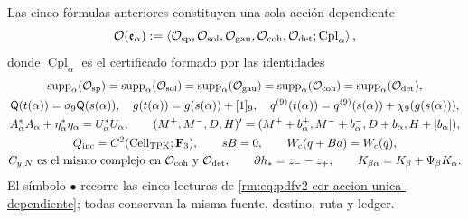 Las cinco fórmulas anteriores constituyen una sola acción dependiente
\begin{equation}
\label{rm:eq:pdfv2-cor-accion-unica-dependiente}
 \mathcal O(\mathfrak e_\alpha)
 :=\left\langle
 \mathcal O_{\rm sp},\mathcal O_{\rm sol},\mathcal O_{\rm gau},
 \mathcal O_{\rm coh},\mathcal O_{\rm det};
 \operatorname{Cpl}_\alpha
 \right\rangle,
\end{equation}
donde \(\operatorname{Cpl}_\alpha\) es el certificado formado por las
identidades
\begin{equation}
\label{rm:eq:pdfv2-cor-acoplamientos-unicos}
 \begin{gathered}
 \operatorname{supp}_\alpha(\mathcal O_{\rm sp})
 =\operatorname{supp}_\alpha(\mathcal O_{\rm sol})
 =\operatorname{supp}_\alpha(\mathcal O_{\rm gau})
 =\operatorname{supp}_\alpha(\mathcal O_{\rm coh})
 =\operatorname{supp}_\alpha(\mathcal O_{\rm det}),\\
 \mathsf Q(t(\alpha))=\sigma_9\mathsf Q(s(\alpha)),\quad
 g(t(\alpha))=g(s(\alpha))+[1]_9,\quad
 q^{(9)}(t(\alpha))=q^{(9)}(s(\alpha))+\chi_9(g(s(\alpha))),\\
 A_\alpha^*A_\alpha+\eta_\alpha^*\eta_\alpha=U_\alpha^*U_\alpha,\qquad
 (M^+,M^-,D,H)'=(M^++b_\alpha^+,M^-+b_\alpha^-,
 D+b_\alpha,H+|b_\alpha|),\\
 Q_{\rm inc}=C^2(\operatorname{Cell}_{\rm TPK};\mathbf F_3),\qquad
 sB=0,\qquad W_c(q+Ba)=W_c(q),\\
 C_{y,N}\text{ es el mismo complejo en }
 \mathcal O_{\rm coh}\text{ y }\mathcal O_{\rm det},\qquad
 \partial h_*=z_--z_+,\qquad
 K_{\beta\alpha}=K_\beta+\Psi_\beta K_\alpha.
 \end{gathered}
\end{equation}
El símbolo \(\bullet\) recorre las cinco lecturas de
\eqref{rm:eq:pdfv2-cor-accion-unica-dependiente}; todas conservan la misma
fuente, destino, ruta y ledger.

